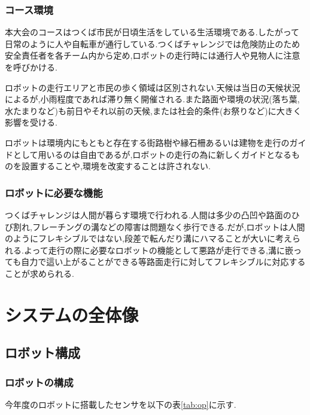 \documentclass[12pt,oneside]{sotsuken_paper}
\begin{document}
\subsection{コース環境} 
本大会のコースはつくば市民が日頃生活をしている生活環境である.したがって日常のように人や自転車が通行している.つくばチャレンジでは危険防止のため安全責任者を各チーム内から定め,ロボットの走行時には通行人や見物人に注意を呼びかける. 


ロボットの走行エリアと市民の歩く領域は区別されない.天候は当日の天候状況によるが,小雨程度であれば滞り無く開催される.また路面や環境の状況(落ち葉,水たまりなど)も前日やそれ以前の天候,または社会的条件(お祭りなど)に大きく影響を受ける. 


ロボットは環境内にもともと存在する街路樹や縁石柵あるいは建物を走行のガイドとして用いるのは自由であるが,ロボットの走行の為に新しくガイドとなるものを設置することや,環境を改変することは許されない. 

\subsection{ロボットに必要な機能} 
つくばチャレンジは人間が暮らす環境で行われる.人間は多少の凸凹や路面のひび割れ,フレーチングの溝などの障害は問題なく歩行できる.だが,ロボットは人間のようにフレキシブルではない,段差で転んだり溝にハマることが大いに考えられる.よって走行の際に必要なロボットの機能として悪路が走行できる,溝に嵌っても自力で這い上がることができる等路面走行に対してフレキシブルに対応することが求められる. 



\chapter{システムの全体像} 
\section{ロボット構成}
\subsection{ロボットの構成} 
今年度のロボットに搭載したセンサを以下の表\ref{tab:op}に示す. 
\end{document}
